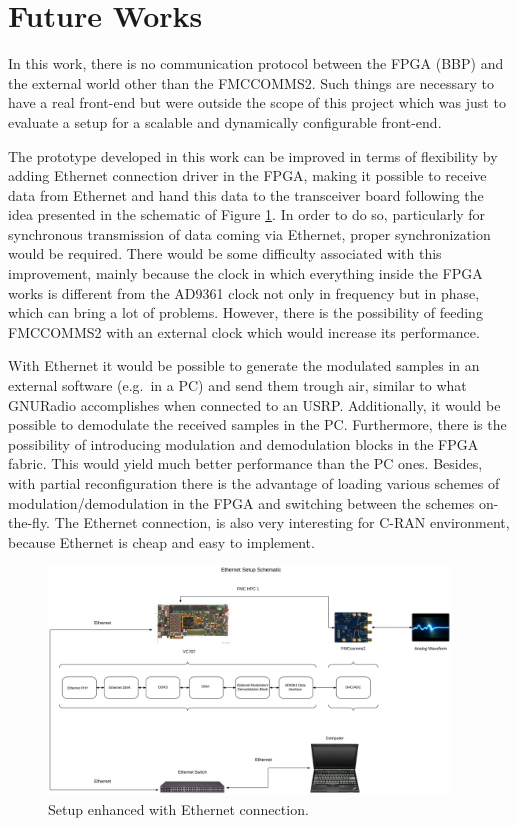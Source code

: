 \section{Future Works}
\label{sec:futurew}

In this work, there is no communication protocol between the FPGA (BBP) and the
external world other than the FMCCOMMS2. Such things are necessary to have a real
front-end but were outside the scope of this project which was just to evaluate a
setup for a scalable and dynamically configurable front-end.

The prototype developed in this work can be improved in terms of flexibility by
adding Ethernet connection driver in the FPGA, making it possible to receive
data from Ethernet and hand this data to the transceiver board following the
idea presented in the schematic of Figure \ref{fig:setupeth}. In order to do so,
particularly for synchronous transmission of data coming via Ethernet, proper
synchronization would be required. There would be some difficulty associated
with this improvement, mainly because the clock in which everything inside the
FPGA works is different from the AD9361 clock not only in frequency but in
phase, which can bring a lot of problems. However, there is the possibility of
feeding FMCCOMMS2 with an external clock which would increase its performance.

With Ethernet it would be possible to generate the modulated samples in an
external software (e.g.\ in a PC) and send them trough air, similar to what
GNURadio accomplishes when connected to an USRP. Additionally, it would be
possible to demodulate the received samples in the PC. Furthermore, there is the
possibility of introducing modulation and demodulation blocks in the FPGA
fabric. This would yield much better performance than the PC ones. Besides, with
partial reconfiguration there is the advantage of loading various schemes of
modulation/demodulation in the FPGA and switching between the schemes
on-the-fly. The Ethernet connection, is also very interesting for C-RAN
environment, because Ethernet is cheap and easy to implement.

\begin{figure}[htbp]
    \centering
    \includegraphics[width=0.95\textwidth]{./figures/eth_setup}
    \caption{ Setup enhanced with Ethernet connection.
    \label{fig:setupeth}}
\end{figure}
